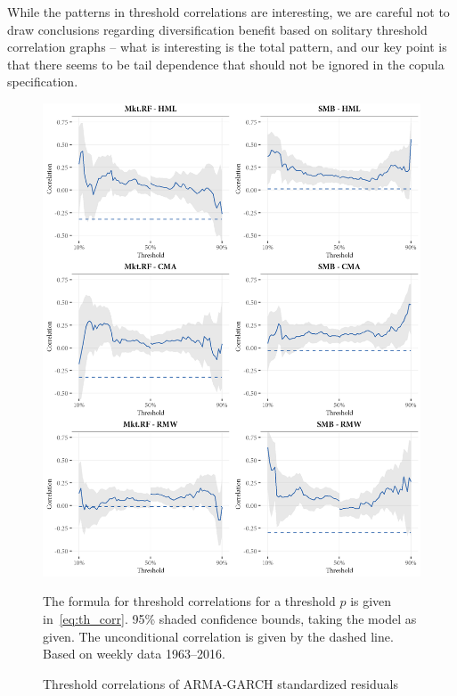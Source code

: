 While the patterns in threshold correlations are interesting, we are careful not to draw conclusions regarding diversification benefit based on solitary threshold correlation graphs -- what is interesting is the total pattern, and our key point is that there seems to be tail dependence that should not be ignored in the copula specification.

\begin{figure}[p]
  \centering
  \includegraphics[scale=1]{graphics/threshold1.png}
  \footnotesize
  \caption{Threshold correlations of ARMA-GARCH standardized residuals}

  \begin{longcaption}
    The formula for threshold correlations for a threshold $p$ is given in~\autoref{eq:th_corr}. 95\% shaded confidence bounds, taking the model as given. The unconditional correlation is given by the dashed line. Based on weekly data 1963--2016.
  \end{longcaption}
  \label{fig:threshold1}
\end{figure}

